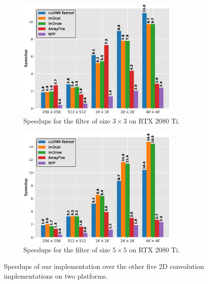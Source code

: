 \begin{figure}
	\begin{subfigure}{\columnwidth}
		\centering
		 \includegraphics[width=\columnwidth,height=6cm]{./figure/2d_norm_f3_rtx2080.eps}
		 \caption{Speedups for the filter of size $3 \times 3$ on RTX 2080 Ti.}
		 \label{fig:2druntimef3c12080}
	\end{subfigure}
	\begin{subfigure}{\columnwidth}
		\centering
		 \includegraphics[width=\columnwidth,height=6cm]{./figure/2d_norm_f5_rtx2080.eps}
		 \caption{Speedups for the filter of size $5 \times 5$ on RTX 2080 Ti.}
		 \label{fig:2druntimef5c12080}
	\end{subfigure}
	
	\caption{Speedups of our implementation over the other five 2D convolution implementations on two platforms.}
   \label{fig:2druntime}
\end{figure}

